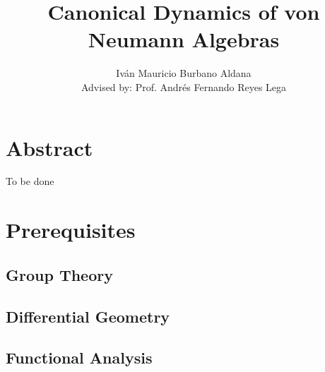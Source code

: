 \documentclass{book}
\title{Canonical Dynamics of von Neumann Algebras}
\author{Iván Mauricio Burbano Aldana\\
Advised by: Prof. Andrés Fernando Reyes Lega}
\begin{document}
\maketitle

\chapter*{Abstract}

To be done

\tableofcontents

\chapter{Prerequisites}

\section{Group Theory}



\section{Differential Geometry}

  

\section{Functional Analysis}


\end{document}
